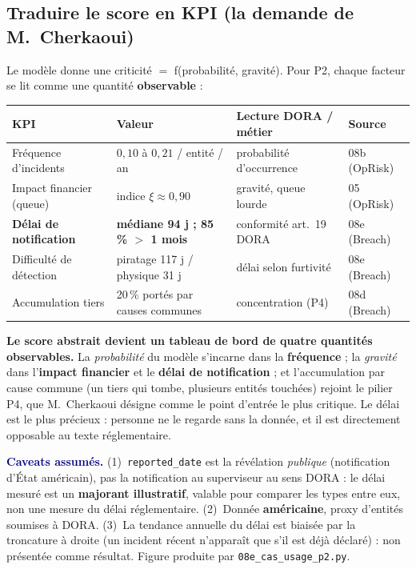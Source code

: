 \documentclass[11pt,a4paper]{article}
\begin{document}
\subsection*{Traduire le score en KPI (la demande de M.~Cherkaoui)}

Le modèle donne une criticité $=$ f(probabilité, gravité). Pour P2, chaque facteur se lit
comme une quantité \textbf{observable} :

\begin{center}\small
\renewcommand{\arraystretch}{1.25}
\begin{tabular}{@{}l l l l@{}}
\toprule
\textbf{KPI} & \textbf{Valeur} & \textbf{Lecture DORA / métier} & \textbf{Source} \\
\midrule
Fréquence d'incidents & $0{,}10$ à $0{,}21$ / entité / an & probabilité d'occurrence & 08b (OpRisk) \\
Impact financier (queue) & indice $\xi \approx 0{,}90$ & gravité, queue lourde & 05 (OpRisk) \\
\textbf{Délai de notification} & \textbf{médiane 94 j ; 85\,\% $>$ 1 mois} & conformité art.~19 DORA & 08e (Breach) \\
Difficulté de détection & piratage 117 j / physique 31 j & délai selon furtivité & 08e (Breach) \\
Accumulation tiers & 20\,\% portés par causes communes & concentration (P4) & 08d (Breach) \\
\bottomrule
\end{tabular}
\end{center}

\begin{cle}
\textbf{Le score abstrait devient un tableau de bord de quatre quantités observables.} La
\emph{probabilité} du modèle s'incarne dans la \textbf{fréquence} ; la \emph{gravité} dans
l'\textbf{impact financier} et le \textbf{délai de notification} ; et l'accumulation par
cause commune (un tiers qui tombe, plusieurs entités touchées) rejoint le pilier P4, que
M.~Cherkaoui désigne comme le point d'entrée le plus critique. Le délai est le plus
précieux : personne ne le regarde sans la donnée, et il est directement opposable au
texte réglementaire.
\end{cle}

\vspace{-0.1cm}
\noindent\footnotesize\textcolor{navy}{\textbf{Caveats assumés.}} (1)~\texttt{reported\_date}
est la révélation \emph{publique} (notification d'État américain), pas la notification au
superviseur au sens DORA : le délai mesuré est un \textbf{majorant illustratif}, valable
pour comparer les types entre eux, non une mesure du délai réglementaire. (2)~Donnée
\textbf{américaine}, proxy d'entités soumises à DORA. (3)~La tendance annuelle du délai est
biaisée par la troncature à droite (un incident récent n'apparaît que s'il est déjà
déclaré) : non présentée comme résultat. Figure produite par \texttt{08e\_cas\_usage\_p2.py}.
\end{document}
